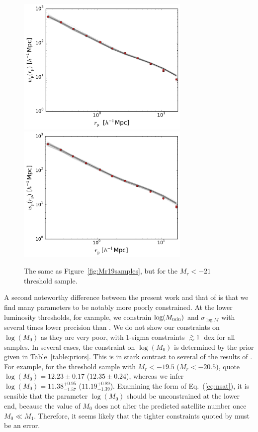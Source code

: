 \documentclass[usenatbib,usegraphicx,letterpaper]{mn2e}
\newcommand{\gsim}{\lower0.6ex\vbox{\hbox{$ \buildrel{\textstyle >}\over{\sim}\ $}}}
\def\gtsima{$\; \buildrel > \over \sim \;$}
\def\gsim{\lower.7ex\hbox{\gtsima}}
\def\ga{\gsim}
\def\gta{\ga}
\begin{document}
\begin{figure}
\begin{center}
\includegraphics[width=8.3cm]{Mr21samples.pdf}
\includegraphics[width=8.3cm]{Mr21ABsamples.pdf}
\caption{
The same as Figure~\ref{fig:Mr19samples}, but for the $M_r<-21$ threshold sample.
}
\label{fig:Mr21samples}
\end{center}
\end{figure}


A second noteworthy difference between the present work and that of
\citet{zehavi_etal11} is that we find many parameters to be notably
more poorly constrained. At the lower luminosity thresholds, for
example, we constrain $\log (M_{\rm min})$ and $\sigma_{\log M}$ with
several times lower precision than \citet{zehavi_etal11}. We do not
show our constraints on $\log (M_0)$ as they are very poor, with
1-sigma constraints $\gta 1$~dex for all samples. In several cases,
the constraint on $\log (M_0)$ is determined by the prior given in
Table~\ref{table:priors}. This is in stark contrast to several of the
results of \citet{zehavi_etal11}. For example, for the threshold
sample with $M_r < -19.5$ ($M_r < -20.5$), \citet{zehavi_etal11} quote
$\log (M_0) = 12.23 \pm 0.17$ ($12.35 \pm 0.24$), whereas we infer
$\log (M_0) = 11.38^{+0.95}_{-1.57}$
($11.19^{+0.89}_{-1.39}$). Examining the form of Eq.~(\ref{eq:nsat}),
it is sensible that the parameter $\log (M_0)$ should be unconstrained
at the lower end, because the value of $M_0$ does not alter the
predicted satellite number once $M_0 \ll M_1$. Therefore, it seems
likely that the tighter constraints quoted by \citet{zehavi_etal11}
must be an error.
\end{document}
